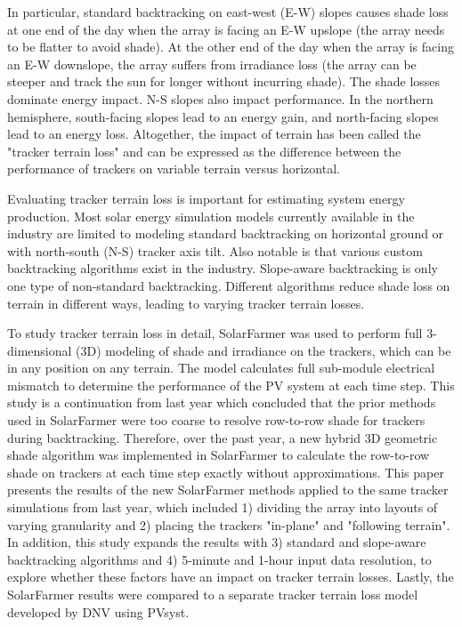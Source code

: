 \documentclass[conference]{IEEEtran}
\begin{document}
In particular, standard backtracking on east-west (E-W) slopes causes shade loss at one end of the day when the array is facing an E-W upslope (the array needs to be flatter to avoid shade). At the other end of the day when the array is facing an E-W downslope, the array suffers from irradiance loss (the array can be steeper and track the sun for longer without incurring shade). The shade losses dominate energy impact. N-S slopes also impact performance. In the northern hemisphere, south-facing slopes lead to an energy gain, and north-facing slopes lead to an energy loss. Altogether, the impact of terrain has been called the "tracker terrain loss" and can be expressed as the difference between the performance of trackers on variable terrain versus horizontal. 

Evaluating tracker terrain loss is important for estimating system energy production. Most solar energy simulation models currently available in the industry are limited to modeling standard backtracking on horizontal ground or with north-south (N-S) tracker axis tilt. Also notable is that various custom backtracking algorithms exist in the industry. Slope-aware backtracking is only one type of non-standard backtracking. Different algorithms reduce shade loss on terrain in different ways, leading to varying tracker terrain losses. 

To study tracker terrain loss in detail, SolarFarmer \cite{Mikofski_8547323} was used to perform full 3-dimensional (3D) modeling of shade and irradiance on the trackers, which can be in any position on any terrain. The model calculates full sub-module electrical mismatch to determine the performance of the PV system at each time step. This study is a continuation from last year \cite{Mikofski_9300381} which concluded that the prior methods used in SolarFarmer were too coarse to resolve row-to-row shade for trackers during backtracking. Therefore, over the past year, a new hybrid 3D geometric shade algorithm was implemented in SolarFarmer to calculate the row-to-row shade on trackers at each time step exactly without approximations. This paper presents the results of the new SolarFarmer methods applied to the same tracker simulations from last year, which included 1) dividing the array into layouts of varying granularity and 2) placing the trackers "in-plane" and "following terrain". In addition, this study expands the results with 3) standard and slope-aware backtracking algorithms and 4) 5-minute and 1-hour input data resolution, to explore whether these factors have an impact on tracker terrain losses. Lastly, the SolarFarmer results were compared to a separate tracker terrain loss model developed by DNV using PVsyst. 
\end{document}
